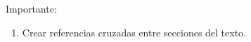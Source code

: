 
\newpage
\pagecolor{yellow!30}
Importante:
  \begin{enumerate}
    \item Crear referencias cruzadas entre secciones del texto.
  \end{enumerate}






\clearpage
\nopagecolor

